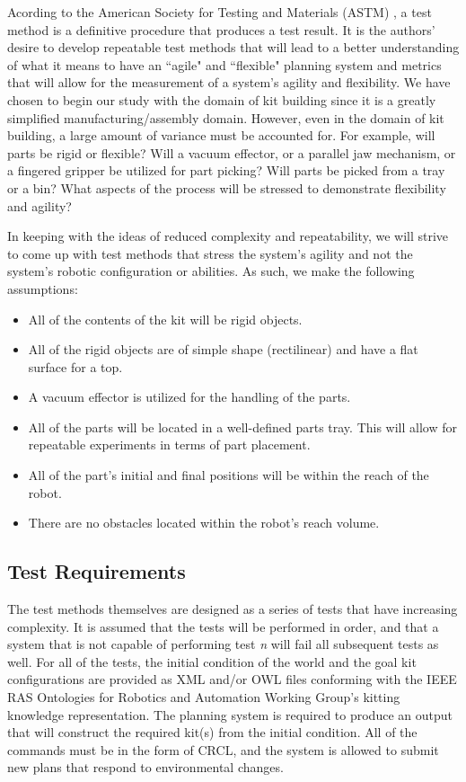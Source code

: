 Acording to the American Society for Testing and Materials (ASTM) \cite[p. vii]{ASTM99}, a test method is a
definitive procedure that produces a test result. It is the authors' desire to develop repeatable test methods that will
lead to a better understanding of what it means to have an ``agile" and ``flexible" planning system and metrics that 
will allow for the measurement of a system's agility and flexibility. We have chosen to begin our study
with the domain of kit building since it is a greatly simplified manufacturing/assembly domain. However, 
even in the domain of kit building, a large amount of variance  must be accounted for. For
example, will parts be rigid or flexible? Will a vacuum effector, or a parallel jaw mechanism, or a fingered 
gripper be utilized for part picking? Will parts be picked from a tray or a bin? What aspects of the
process will be stressed to demonstrate flexibility and agility?

In keeping with the ideas of reduced complexity and repeatability, we will strive to come up with test methods that stress
the system's agility and not the system's robotic configuration or abilities. As such, we make the following assumptions:
\begin{itemize}
	\item All of the contents of the kit will be rigid objects.
	\item All of the rigid objects are of simple shape (rectilinear) and have a flat surface for a top.
	\item A vacuum effector is utilized for the handling of the parts.
	\item All of the parts will be located in a well-defined parts tray. This will allow for repeatable experiments in terms of part placement.
	\item All of the part's initial and final positions will be within the reach of the robot.
	\item There are no obstacles located within the robot's reach volume.
\end{itemize}

\subsection{Test Requirements}
The test methods themselves are designed as a series of tests that have increasing complexity. It is assumed that the tests will be performed
in order, and that a system that is not capable of performing test {\it n} will fail all subsequent tests as well. For all of the tests,
the initial condition of the world and the goal kit configurations are provided as XML and/or OWL files conforming with the IEEE RAS Ontologies
for Robotics and Automation Working Group's kitting knowledge representation. The planning system is required to produce an output that
will construct the required kit(s) from the initial condition. All of the commands must be in the form of CRCL, and the system
is allowed to submit new plans that respond to environmental changes.

